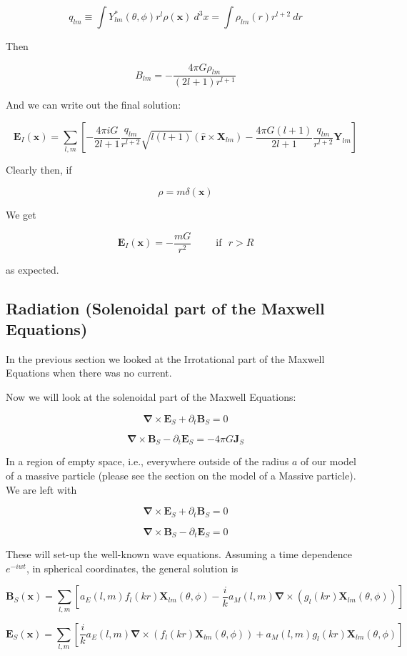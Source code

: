 \documentclass {article}
\renewcommand\vec{\mathbf}
\let\OldS\nabla
\renewcommand{\nabla}{\boldsymbol{\OldS}}
\let\OldHat\hat
\renewcommand{\hat}[1]{\OldHat{\mathbf{#1}}}
\begin{document}
$$q_{lm} \equiv \int Y_{lm}^* (\theta, \phi) r^l  \rho (\vec x) ~ d^3x = \int \rho_{lm} (r) r^{l+2} ~ dr $$

Then 

$$ B_{lm} = - \frac {4 \pi G \rho_{lm}} {(2l +1) r^{l+1}} $$ 
 

And we can write out the final solution:

$$\vec E_I(\vec x) = \sum_{l,m} \left[ -\frac {4\pi i G }{2l+1} \frac {q_{lm}}{r^{l+2}} \sqrt {l(l+1)} \left(\hat r \times \vec X_{lm} \right)  - \frac {4 \pi G (l+1)}{2l+1} \frac {q_{lm}}{r^{l+2}} \vec Y_{lm} \right] $$


Clearly then, if

$$\rho = m\delta(\vec x) $$

We get

$$\vec E_I(\vec x) = - \frac {mG} {r^2}  ~~~~~~~~~~~ \textrm{if} ~~~ r > R$$

as expected.
\newpage
\subsection{Radiation (Solenoidal part of the Maxwell Equations)}

In the previous section we looked at the Irrotational part of the Maxwell Equations when there was no current.

Now we will look at the solenoidal part of the Maxwell Equations:

$$\nabla \times \vec E_S + \partial_t \vec B_S = 0 $$

$$\nabla \times \vec B_S - \partial_t \vec E_S =  - 4 \pi G \vec J_S$$

In a region of empty space, i.e., everywhere outside of the radius $a$ of our model of a massive particle (please see the section on the model of a Massive particle). We are left with 

$$\nabla \times \vec E_S + \partial_t \vec B_S = 0 $$

$$\nabla \times \vec B_S - \partial_t \vec E_S =  0$$

These will set-up the well-known wave equations. Assuming a time dependence $e^{-iwt}$, in spherical coordinates, the general solution is

$$\vec B_S (\vec x) = \sum_{l, m} \left[ a_E(l,m)f_l(kr) \vec X_{lm}(\theta , \phi) - \frac i k a_M (l, m) \nabla \times \left(  g_l (kr) \vec X_{lm} (\theta , \phi) \right) \right]$$

$$ \vec E_S (\vec x) = \sum_{l, m} \left[ \frac i k a_E(l,m) \nabla \times  \left( f_l (kr) \vec X_{lm}(\theta, \phi)\right) + a_M(l,m) g_l (kr) \vec X_{lm}(\theta, \phi) \right]$$
\end{document}
